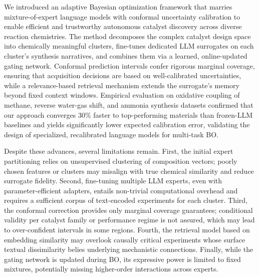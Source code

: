 \documentclass{article}
\begin{document}
We introduced an adaptive Bayesian optimization framework that marries mixture-of-expert language models with conformal uncertainty calibration to enable efficient and trustworthy autonomous catalyst discovery across diverse reaction chemistries. The method decomposes the complex catalyst design space into chemically meaningful clusters, fine-tunes dedicated LLM surrogates on each cluster’s synthesis narratives, and combines them via a learned, online-updated gating network. Conformal prediction intervals confer rigorous marginal coverage, ensuring that acquisition decisions are based on well-calibrated uncertainties, while a relevance-based retrieval mechanism extends the surrogate’s memory beyond fixed context windows. Empirical evaluation on oxidative coupling of methane, reverse water-gas shift, and ammonia synthesis datasets confirmed that our approach converges 30\% faster to top-performing materials than frozen-LLM baselines and yields significantly lower expected calibration error, validating the design of specialized, recalibrated language models for multi-task BO.

Despite these advances, several limitations remain. First, the initial expert partitioning relies on unsupervised clustering of composition vectors; poorly chosen features or clusters may misalign with true chemical similarity and reduce surrogate fidelity. Second, fine-tuning multiple LLM experts, even with parameter-efficient adapters, entails non-trivial computational overhead and requires a sufficient corpus of text-encoded experiments for each cluster. Third, the conformal correction provides only marginal coverage guarantees; conditional validity per catalyst family or performance regime is not assured, which may lead to over-confident intervals in some regions. Fourth, the retrieval model based on embedding similarity may overlook causally critical experiments whose surface textual dissimilarity belies underlying mechanistic connections. Finally, while the gating network is updated during BO, its expressive power is limited to fixed mixtures, potentially missing higher-order interactions across experts.
\end{document}
